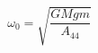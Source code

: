 \begin{equation} \label{eq:omega0_equation_linear}
\omega_{0} = \sqrt{\frac{GM g m}{A_{44}}}
\end{equation}
